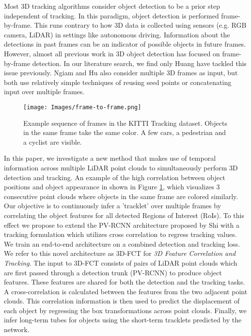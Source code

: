\documentclass[10pt,twocolumn,letterpaper]{article}
\begin{document}
Most 3D tracking algorithms \cite{Kim21ICRA,Luiten2020,Qiao2020} consider object detection to be a prior step independent of tracking. In this paradigm, object detection is performed frame-by-frame. This runs contrary to how 3D data is collected using sensors (e.g. RGB camera, LiDAR) in settings like autonomous driving. Information about the detections in past frames can be an indicator of possible objects in future frames. However, almost all previous work in 3D object detection \cite{Lang_2019_CVPR,Shi_2020_CVPR,9018080,Yan2018} has focused on frame-by-frame detection. In our literature search, we find only Huang \etal\cite{Huang2020a} have tackled this issue previously. Ngiam \etal\cite{Ngiam2019} and Hu \etal\cite{Hu_2020_CVPR} also consider multiple 3D frames as input, but both use relatively simple techniques of reusing seed points or concatenating input over multiple frames.
\begin{figure}[t]
   \begin{center}
   \texttt{[image: Images/frame-to-frame.png]}
   \end{center}
      \caption{Example sequence of frames in the KITTI\cite{Geiger2013IJRR} Tracking dataset. Objects in the same frame take the same color. A few cars, a  pedestrian and a cyclist are visible.}
   \label{fig:f2f_3d_objs}
\end{figure}

In this paper, we investigate a new method that makes use of temporal information across multiple LiDAR point clouds to simultaneously perform 3D detection and tracking. An example of the high correlation between object positions and object appearance in shown in Figure \ref{fig:f2f_3d_objs}, which visualizes 3 consecutive point clouds where objects in the same frame are colored similarly. Our objective is to continuously infer a 'tracklet' over multiple frames by correlating the object features for all detected Regions of Interest (RoIs). To this effect we propose to extend the PV-RCNN architecture proposed by Shi \etal\cite{Shi_2020_CVPR} with a tracking formulation which utilizes cross correlation to regress tracking values. We train an end-to-end architecture on a combined detection and tracking loss. We refer to this novel architecture as 3D-FCT for {\em3D Feature Correlation and Tracking}. The input to 3D-FCT consists of pairs of LiDAR point clouds which are first passed through a detection trunk (\eg PV-RCNN) to produce object features. These features are shared for both the detection and the tracking tasks. A cross-correlation is calculated between the features from the two adjacent point clouds. This correlation information is then used to predict the displacement of each object by regressing the box transformations across point clouds. Finally, we infer long-term tubes for objects using the short-term tracklets predicted by the network.
\end{document}

